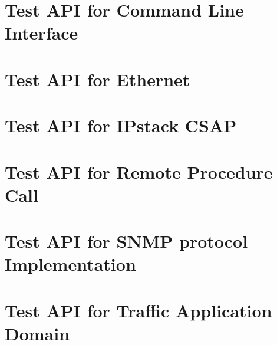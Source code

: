 \documentclass[a4paper]{book}
\begin{document}
\chapter{Test API for Command Line Interface}

\chapter{Test API for Ethernet}

\chapter{Test API for IPstack CSAP}


\chapter{Test API for Remote Procedure Call}


















\chapter{Test API for SNMP protocol Implementation}









\chapter{Test API for Traffic Application Domain}

\printindex
\end{document}

